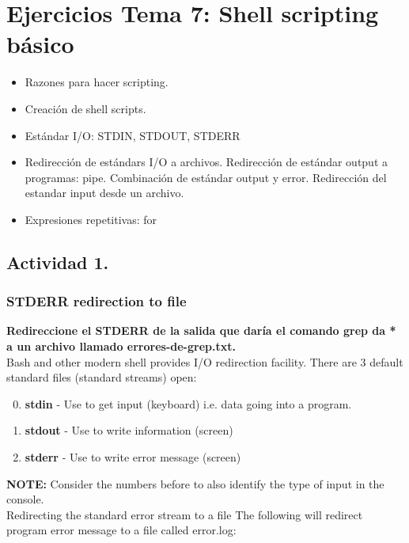 \documentclass[a4paper,11pt,spanish]{article} %
\begin{document}
\pagebreak

\section{Ejercicios Tema 7: Shell scripting básico}

\begin{itemize}
 \item Razones para hacer scripting.
 \item Creación de shell scripts.
 \item Estándar I/O: STDIN, STDOUT, STDERR
 \item Redirección de estándars I/O a archivos.
  \subitem Redirección de estándar output a programas: pipe.
  \subitem Combinación de estándar output y error.
  \subitem Redirección del estandar input desde un archivo.
 \item Expresiones repetitivas: for
 \end{itemize}


\subsection{Actividad 1.}

\subsubsection{STDERR redirection to file}

\textbf{Redireccione el STDERR de la salida que daría el comando grep da * a 
un archivo llamado errores-de-grep.txt.}\\

Bash and other modern shell provides I/O redirection facility. 
There are 3 default standard files (standard streams) open:

\begin{enumerate}
\setcounter{enumi}{-1}
 \item \textbf{stdin} - Use to get input (keyboard) i.e. data going into a program.
 \item \textbf{stdout} - Use to write information (screen)
 \item \textbf{stderr} - Use to write error message (screen)
\end{enumerate}

\textbf{NOTE:} Consider the numbers before to also identify the type of input in the console.\\

Redirecting the standard error stream to a file
The following will redirect program error message to a file called error.log:
\end{document}
